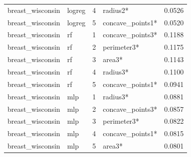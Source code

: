 \begin{tabular}{llrlr}
breast\_wisconsin & logreg & 4 & radius2* & 0.0526 \\
breast\_wisconsin & logreg & 5 & concave\_points1* & 0.0520 \\
breast\_wisconsin & rf & 1 & concave\_points3* & 0.1188 \\
breast\_wisconsin & rf & 2 & perimeter3* & 0.1175 \\
breast\_wisconsin & rf & 3 & area3* & 0.1143 \\
breast\_wisconsin & rf & 4 & radius3* & 0.1100 \\
breast\_wisconsin & rf & 5 & concave\_points1* & 0.0941 \\
breast\_wisconsin & mlp & 1 & radius3* & 0.0881 \\
breast\_wisconsin & mlp & 2 & concave\_points3* & 0.0857 \\
breast\_wisconsin & mlp & 3 & perimeter3* & 0.0822 \\
breast\_wisconsin & mlp & 4 & concave\_points1* & 0.0815 \\
breast\_wisconsin & mlp & 5 & area3* & 0.0801 \\
\bottomrule
\end{tabular}

